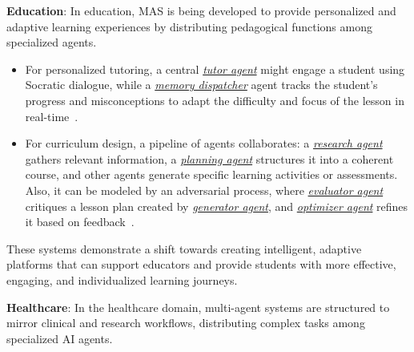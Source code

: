 \textbf{Education}:
In education, MAS is being developed to provide personalized and adaptive learning experiences by distributing pedagogical functions among specialized agents.
\begin{itemize}
    \item For personalized tutoring, a central \underline{\emph{tutor agent}} might engage a student using Socratic dialogue, while a \underline{\emph{memory dispatcher}} agent tracks the student's progress and misconceptions to adapt the difficulty and focus of the lesson in real-time~\cite{chudziak2025ai}.
    \item For curriculum design, a pipeline of agents collaborates: a \underline{\emph{research agent}} gathers relevant information, a \underline{\emph{planning agent}} structures it into a coherent course, and other agents generate specific learning activities or assessments. Also, it can be modeled by an adversarial process, where \underline{\emph{evaluator agent}} critiques a lesson plan created by \underline{\emph{generator agent}}, and \underline{\emph{optimizer agent}} refines it based on feedback~\cite{zhang2025eduplanner}. 
\end{itemize}

These systems demonstrate a shift towards creating intelligent, adaptive platforms that can support educators and provide students with more effective, engaging, and individualized learning journeys.

\textbf{Healthcare}:
In the healthcare domain, multi-agent systems are structured to mirror clinical and research workflows, distributing complex tasks among specialized AI agents.

